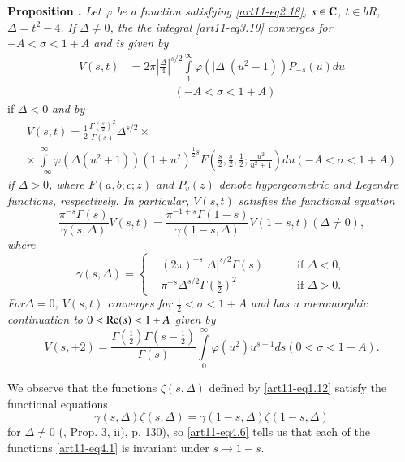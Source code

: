 \medskip
\noindent
{\bfseries Proposition .\label{art11-prop4}}
\textit{Let $\varphi$ be a function satisfying \eqref{art11-eq2.18}, $s \in \mathbf{C}$, $t \in bR$, $\Delta = t^2 -4$. If $\Delta \neq 0$, the the integral \eqref{art11-eq3.10} converges for $-A < \sigma < 1+ A$ and is given by }
\begin{align*}
V (s,t) & = 2 \pi \left| \frac{\Delta}{4}\right|^{s/2} \int\limits^\infty_1 \varphi \left(|\Delta| (u^2 -1) \right) P_{-s} (u) du\\
& \qquad \qquad (-A < \sigma < 1+ A) \tag{4.4}\label{art11-eq4.4}
\end{align*}
if $\Delta < 0$ \textit{and by }
\begin{gather*}
V(s,t) = \frac{1}{2} \frac{\Gamma \left(\frac{s}{2} \right)^2}{\Gamma (s)} \Delta^{s/2} \times \tag{4.5}\label{art11-eq4.5}\\
\times \int\limits^\infty_{-\infty} \varphi (\Delta (u^2 + 1)) (1+u^2)^{\frac{1}{2}s} F \left(\frac{s}{2}, \frac{s}{2}; \frac{1}{2}; \frac{u^2}{u^2+1} \right) du (-A < \sigma < 1 + A)
\end{gather*}
\textit{if $\Delta > 0$, where $F(a, b; c;z)$ and $P_v (z)$ denote hypergeometric and Legendre functions, respectively. In particular, $V(s,t)$ satisfies the functional equation}
\begin{equation*}
\frac{\pi^{-s} \Gamma (s)}{\gamma (s,\Delta)} V(s,t) = \frac{\pi^{-1+s} \Gamma (1-s)}{\gamma (1-s, \Delta)} V(1-s,t) (\Delta \neq 0),
\tag{4.6}\label{art11-eq4.6}
\end{equation*}
\textit{where }
$$
\gamma (s, \Delta) =
\left\{
\begin{aligned}
& (2\pi)^{-s} |\Delta|^{s/2} \Gamma (s) \quad && \text{ if } \Delta < 0,\\
&  \pi^{-s} \Delta^{s/2} \Gamma \left(\frac{s}{2} \right)^2 && \text{ if } \Delta > 0.
\end{aligned}
\right.
$$
\textit{For\pageoriginale $\Delta =0$, $V(s,t)$ converges for $\frac{1}{2} < \sigma < 1+ A$ and has a meromorphic continuation to $0 < \operatorname{Re} (s) < 1+ A$ given by}
\begin{equation*}
V(s , \pm 2) =  \frac{\Gamma (\frac{1}{2}) \Gamma (s - \frac{1}{2})}{\Gamma (s)} \int\limits^\infty_{0} \varphi (u^2) u^{s-1} ds (0< \sigma <1 +A).\tag{4.7} \label{art11-eq4.7}
\end{equation*}

We observe that the functions $\zeta(s,\Delta)$ defined by \eqref{art11-eq1.12} satisfy the functional equations
$$
\gamma (s, \Delta) \zeta(s, \Delta) = \gamma (1 -s , \Delta) \zeta (1-s, \Delta)
$$
for $\Delta \neq 0$ (\cite{art11-10}, Prop. 3, ii), p. 130), so \eqref{art11-eq4.6} tells us that each of the functions \eqref{art11-eq4.1} is invariant under $s \to 1 -s$.

